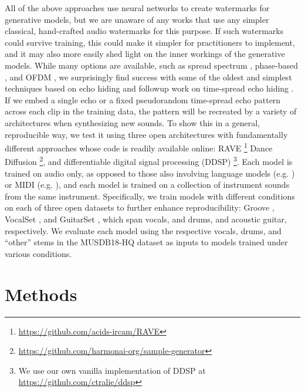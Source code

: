 \documentclass[letterpaper]{article} %
\begin{document}
All of the above approaches use neural networks to create watermarks for generative models, but we are unaware of any works that use any simpler classical, hand-crafted audio watermarks for this purpose.  If such watermarks could survive training, this could make it simpler for practitioners to implement, and it may also more easily shed light on the inner workings of the generative models.  While many options are available, such as spread spectrum \cite{kirovski2001robust}, phase-based \cite{xiaoxiao_dong_data_2004, malik_robust_2007}, and OFDM \cite{eichelberger_receiving_2019}, we surprisingly find success with some of the oldest and simplest techniques based on echo hiding \cite{gruhl1996echo} and followup work on time-spread echo hiding \cite{ko2005time}.  If we embed a single echo or a fixed pseudorandom time-spread echo pattern across each clip in the training data, the pattern will be recreated by a variety of architectures when synthesizing new sounds.  To show this in a general, reproducible way, we test it using three open architectures with fundamentally different approaches whose code is readily available online: RAVE \cite{caillon2021rave}\footnote{ \url{https://github.com/acids-ircam/RAVE} } Dance Diffusion \cite{evans2022dancediffusion} \footnote{ \url{https://github.com/harmonai-org/sample-generator} }, and differentiable digital signal processing (DDSP) \cite{engelddsp}\footnote{We use our own vanilla implementation of DDSP at \url{https://github.com/ctralie/ddsp}}.  Each model is trained on audio only, as opposed to those also involving language models (e.g. \cite{evans2024fast}) or MIDI (e.g. \cite{hawthornemulti}), and each model is trained on a collection of instrument sounds from the same instrument.  Specifically, we train models with different conditions on each of three open datasets to further enhance reproducibility: Groove \cite{groove2019}, VocalSet \cite{wilkins2018vocalset}, and GuitarSet \cite{xi2018guitarset}, which span vocals, and drums, and acoustic guitar, respectively.  We evaluate each model using the respective vocals, drums, and ``other'' stems in the MUSDB18-HQ dataset \cite{musdb18-hq} as inputs to models trained under various conditions.  %




\section{Methods}
\end{document}
